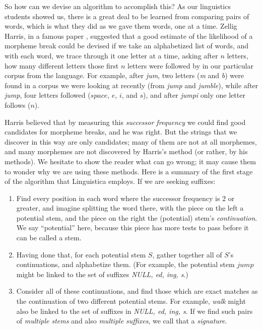 \documentclass[output=paper,colorlinks,citecolor=brown]{langscibook}
\begin{document}
So how can we devise an algorithm to accomplish this? As our linguistics students showed us, there is a great deal to be learned from comparing pairs of words, which is what they did as we gave them words, one at a time. Zellig Harris, in a famous paper \cite{Harris1955}, suggested that a good estimate of the likelihood of a morpheme break could be devised if we take an alphabetized list of words, and with each word, we trace through it one letter at a time, asking after $n$ letters, how many different letters  those first $n$ letters were followed by in our particular corpus from the language. For example, after \textit{jum}, two letters (\textit{m} and \textit{b}) were found in a corpus we were looking at recently (from \textit{jump} and \textit{jumble}), while after \textit{jump}, four letters followed ($space$, $e$, $i$, and $s$), and after \textit{jumpi} only one letter follows ($n$).

Harris believed that by measuring this \textit{successor frequency} we could find good candidates for morpheme breaks, and he was right. But the strings that we discover in this way are only candidates; many of them are not at all morphemes, and many morphemes are not discovered by Harris's method (or rather, by his methods). We hesitate to show the reader what can go wrong; it may cause them to wonder why we are using these methods. Here is a summary of the first stage of the algorithm that Linguistica employs. If we are seeking suffixes:
\begin{enumerate}
\item  Find every position in each word where the successor frequency is 2 or greater, and imagine splitting the word there, with the piece on the left a potential stem, and the piece on the right the (potential) stem's \textit{continuation}. We say ``potential'' here, because this piece has more tests to pass before it can be called a stem.

\item  Having done that, for each potential stem $S$, gather together all of $S$'s continuations, and alphabetize them. (For example, the potential stem $jump$ might be linked to the set of suffixes \textit{NULL, ed, ing, s}.) 

\item   Consider all of these continuations, and find those which are exact matches as the continuation of two different potential stems. For example, \textit{walk} might also be linked to the set of suffixes in \textit{NULL, ed, ing, s}. If we find such pairs of \textit{multiple stems} and also \textit{multiple suffixes}, we call that a \textit{signature}.
\end{enumerate}
\end{document}
